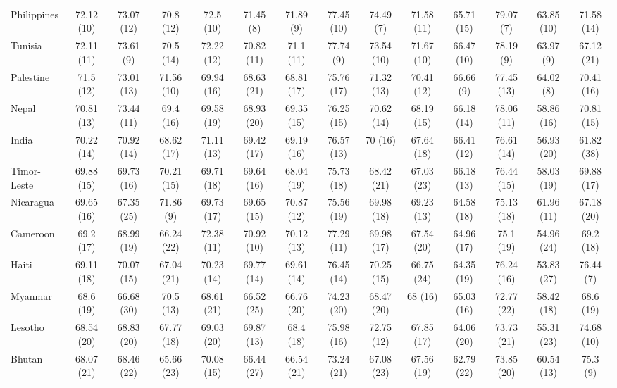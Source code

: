 \begin{longtable}{lccccccccccccc}
Philippines & 72.12 (10) & 73.07 (12) & 70.8 (12) & 72.5 (10) & 71.45 (8) & 71.89 (9) & 77.45 (10) & 74.49 (7) & 71.58 (11) & 65.71 (15) & 79.07 (7) & 63.85 (10) & 71.58 (14) \\ 
Tunisia & 72.11 (11) & 73.61 (9) & 70.5 (14) & 72.22 (12) & 70.82 (11) & 71.1 (11) & 77.74 (9) & 73.54 (10) & 71.67 (10) & 66.47 (10) & 78.19 (9) & 63.97 (9) & 67.12 (21) \\ 
Palestine & 71.5 (12) & 73.01 (13) & 71.56 (10) & 69.94 (16) & 68.63 (21) & 68.81 (17) & 75.76 (17) & 71.32 (13) & 70.41 (12) & 66.66 (9) & 77.45 (13) & 64.02 (8) & 70.41 (16) \\ 
Nepal & 70.81 (13) & 73.44 (11) & 69.4 (16) & 69.58 (19) & 68.93 (20) & 69.35 (15) & 76.25 (15) & 70.62 (14) & 68.19 (15) & 66.18 (14) & 78.06 (11) & 58.86 (16) & 70.81 (15) \\ 
India & 70.22 (14) & 70.92 (14) & 68.62 (17) & 71.11 (13) & 69.42 (17) & 69.19 (16) & 76.57 (13) & 70 (16) & 67.64 (18) & 66.41 (12) & 76.61 (14) & 56.93 (20) & 61.82 (38) \\ 
Timor-Leste & 69.88 (15) & 69.73 (16) & 70.21 (15) & 69.71 (18) & 69.64 (16) & 68.04 (19) & 75.73 (18) & 68.42 (21) & 67.03 (23) & 66.18 (13) & 76.44 (15) & 58.03 (19) & 69.88 (17) \\ 
Nicaragua & 69.65 (16) & 67.35 (25) & 71.86 (9) & 69.73 (17) & 69.65 (15) & 70.87 (12) & 75.56 (19) & 69.98 (18) & 69.23 (13) & 64.58 (18) & 75.13 (18) & 61.96 (11) & 67.18 (20) \\ 
Cameroon & 69.2 (17) & 68.99 (19) & 66.24 (22) & 72.38 (11) & 70.92 (10) & 70.12 (13) & 77.29 (11) & 69.98 (17) & 67.54 (20) & 64.96 (17) & 75.1 (19) & 54.96 (24) & 69.2 (18) \\ 
Haiti & 69.11 (18) & 70.07 (15) & 67.04 (21) & 70.23 (14) & 69.77 (14) & 69.61 (14) & 76.45 (14) & 70.25 (15) & 66.75 (24) & 64.35 (19) & 76.24 (16) & 53.83 (27) & 76.44 (7) \\ 
Myanmar & 68.6 (19) & 66.68 (30) & 70.5 (13) & 68.61 (21) & 66.52 (25) & 66.76 (20) & 74.23 (20) & 68.47 (20) & 68 (16) & 65.03 (16) & 72.77 (22) & 58.42 (18) & 68.6 (19) \\ 
Lesotho & 68.54 (20) & 68.83 (20) & 67.77 (18) & 69.03 (20) & 69.87 (13) & 68.4 (18) & 75.98 (16) & 72.75 (12) & 67.85 (17) & 64.06 (20) & 73.73 (21) & 55.31 (23) & 74.68 (10) \\ 
Bhutan & 68.07 (21) & 68.46 (22) & 65.66 (23) & 70.08 (15) & 66.44 (27) & 66.54 (21) & 73.24 (21) & 67.08 (23) & 67.56 (19) & 62.79 (22) & 73.85 (20) & 60.54 (13) & 75.3 (9) \\ 

\end{longtable}
